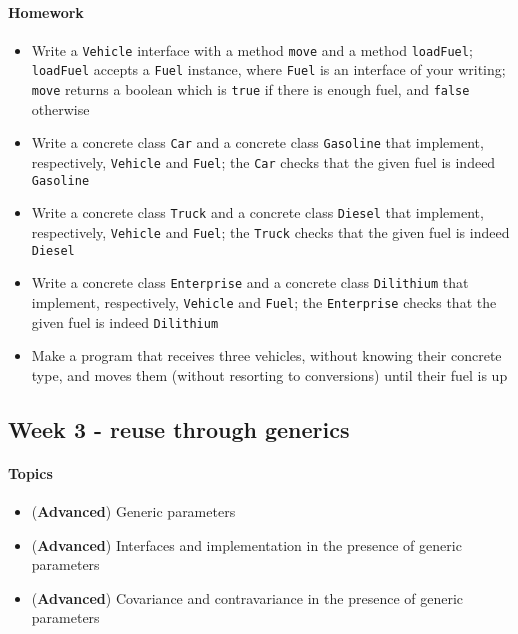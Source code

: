 		\paragraph*{Homework}
		\begin{itemize}
			\item Write a \texttt{Vehicle} interface with a method \texttt{move} and a method \texttt{loadFuel}; \texttt{loadFuel} accepts a \texttt{Fuel} instance, where \texttt{Fuel} is an interface of your writing; \texttt{move} returns a boolean which is \texttt{true} if there is enough fuel, and \texttt{false} otherwise
			\item Write a concrete class \texttt{Car} and a concrete class \texttt{Gasoline} that implement, respectively, \texttt{Vehicle} and \texttt{Fuel}; the \texttt{Car} checks that the given fuel is indeed \texttt{Gasoline}
			\item Write a concrete class \texttt{Truck} and a concrete class \texttt{Diesel} that implement, respectively, \texttt{Vehicle} and \texttt{Fuel}; the \texttt{Truck} checks that the given fuel is indeed \texttt{Diesel}
			\item Write a concrete class \texttt{Enterprise} and a concrete class \texttt{Dilithium} that implement, respectively, \texttt{Vehicle} and \texttt{Fuel}; the \texttt{Enterprise} checks that the given fuel is indeed \texttt{Dilithium}
			\item Make a program that receives three vehicles, without knowing their concrete type, and moves them (without resorting to conversions) until their fuel is up
		\end{itemize}
		
		\subsection{Week 3 - reuse through generics}
		\paragraph*{Topics}			
		\begin{itemize}
			\item (\textbf{Advanced}) Generic parameters
			\item (\textbf{Advanced}) Interfaces and implementation in the presence of generic parameters
			\item (\textbf{Advanced}) Covariance and contravariance in the presence of generic parameters
		\end{itemize}
		
